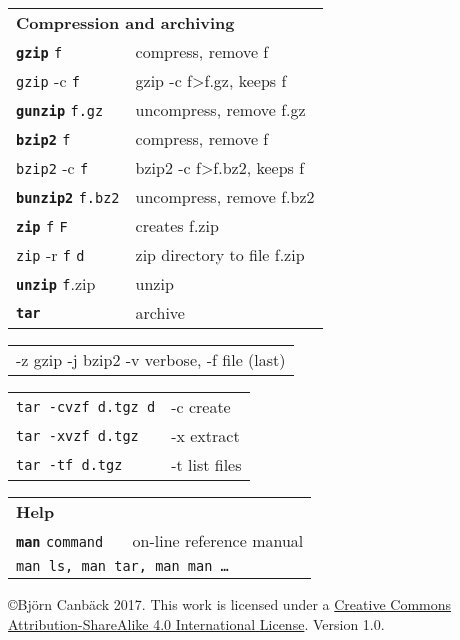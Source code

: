 \documentclass[a4paper,10pt,landscape]{report}
\newcommand{\boxtitle}[1]{{\textbf{\color{RubineRed}#1}}}
\newcommand{\labbr}[1]{{\texttt{\color{Red}#1}}}
\newcommand{\rabbr}[1]{{\color{Red}#1}}
\newcommand{\co}[1]{\texttt{#1}}
\newcommand{\cob}[1]{\texttt{\textbf{#1}}} %
\begin{document}
\begin{multicols}{4}
\begin{mdframed}[style=mybox]
\begin{tabular}{ l l }
\multicolumn{2}{l}{\boxtitle{Compression and archiving}}\\
\cob{gzip} \labbr{f}             & compress, remove \rabbr{f} \\
\co{gzip} -c \labbr{f}           & gzip -c \rabbr{f}\textgreater{}\rabbr{f}.gz, keeps \rabbr{f} \\
\cob{gunzip} \labbr{f}\co{.gz}   & uncompress, remove \rabbr{f}.gz \\
\cob{bzip2} \labbr{f}            & compress, remove \rabbr{f} \\
\co{bzip2} -c \labbr{f}          & bzip2 -c \rabbr{f}\textgreater{}\rabbr{f}.bz2, keeps \rabbr{f} \\
\cob{bunzip2} \labbr{f}\co{.bz2} & uncompress, remove \rabbr{f}.bz2 \\
\cob{zip} \labbr{f} \labbr{F}       & creates \rabbr{f}.zip \\
\co{zip} -r \labbr{f} \labbr{d}     & zip directory to file \rabbr{f}.zip\\
\cob{unzip} \labbr{f}.zip        & unzip \\
\cob{tar}                     & archive \\
\end{tabular}
\begin{tabular}{ l }
-z gzip -j bzip2 -v verbose, -f file (last) \\  
\end{tabular}
\begin{tabular}{ l l }
\co{tar -cvzf \labbr{d}.tgz \labbr{d}} & -c create \\
\co{tar -xvzf \labbr{d}.tgz}        & -x extract \\
\co{tar -tf \labbr{d}.tgz}          & -t list files \\
\end{tabular}
\end{mdframed}

\begin{mdframed}[style=mybox3]
\begin{tabular}{ l }
\multicolumn{1}{l}{\boxtitle{Help}} \\
\cob{man} \labbr{command} ~~~on-line reference manual \\
\co{man ls, man tar, man man \ldots{}} \\
\end{tabular}
\end{mdframed}

\end{multicols}

\begin{center}
{\small{
\copyright{}Bj\"{o}rn Canb\"{a}ck 2017. This work is licensed under a
\href{https://creativecommons.org/licenses/by-sa/4.0/}{Creative Commons
   Attribution-ShareAlike 4.0 International License}. 
Version 1.0.
}}
\end{center}
\end{document}
